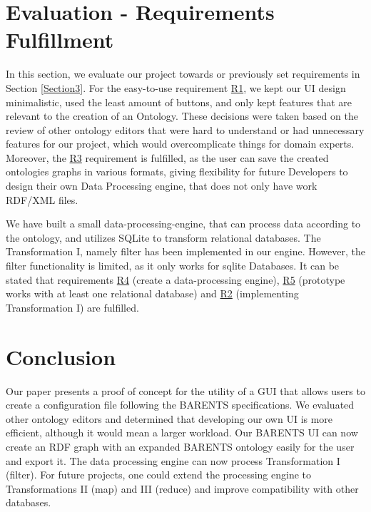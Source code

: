 \documentclass[sigconf, nonacm]{acmart}
\begin{document}
\section{Evaluation - Requirements Fulfillment}\label{Section6}
    In this section, we evaluate our project towards or previously set requirements in Section \ref{Section3}.
    For the easy-to-use requirement \hyperref[Section3]{R1}, we kept our UI design minimalistic, used the least amount of buttons, and only kept features that are relevant to the creation of an Ontology. These decisions were taken based on the review of other ontology editors that were hard to understand or had unnecessary features for our project, which would overcomplicate things for domain experts.
    Moreover, the \hyperref[Section3]{R3} requirement is fulfilled, as the user can save the created ontologies graphs in various formats, giving flexibility for future Developers to design their own Data Processing engine, that does not only have work RDF/XML files.

    We have built a small data-processing-engine, that can process data according to the ontology, and utilizes SQLite to transform relational databases. The Transformation I, namely filter has been implemented in our engine. However, the filter functionality is limited, as it only works for sqlite Databases. It can be stated that requirements \hyperref[Section3]{R4} (create a data-processing engine), \hyperref[Section3]{R5} (prototype works with at least one relational database) and \hyperref[Section3]{R2} (implementing Transformation I) are fulfilled.

\section{Conclusion}
Our paper presents a proof of concept for the utility of a GUI that allows users to create a configuration file following the BARENTS specifications. \newline
We evaluated other ontology editors and determined that developing our own UI is more efficient, although it would mean a larger workload. Our BARENTS UI can now create an RDF graph with an expanded BARENTS ontology easily for the user and export it. The data processing engine can now process Transformation I (filter). \newline
For future projects, one could extend the processing engine to Transformations II (map) and III (reduce) and improve compatibility with other databases.  



\end{document}

